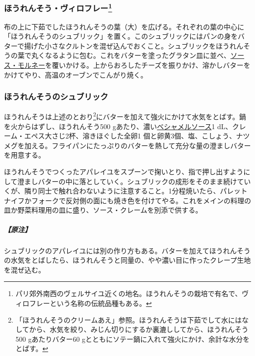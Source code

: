 \begin{recette}
\hypertarget{epinards-a-la-viroflay}{%
\subsubsection[ほうれんそう・ヴィロフレー]{\texorpdfstring{ほうれんそう・ヴィロフレー\footnote{パリ郊外南西のヴェルサイユ近くの地名。ほうれんそうの栽培で有名で、ヴィロフレーという名称の伝統品種もある。}}{ほうれんそう・ヴィロフレー}}\label{epinards-a-la-viroflay}}


布の上に下茹でしたほうれんそうの葉（大）を広げる。それぞれの葉の中心に「ほうれんそうのシュブリック」を置く。このシュブリックにはパンの身をバターで揚げた小さなクルトンを混ぜ込んでおくこと。シュブリックをほうれんそうの葉で丸くなるように包む。これをバターを塗ったグラタン皿に並べ、\protect\hyperlink{sauce-mornay}{ソース・モルネー}を覆いかける。上からおろしたチーズを振りかけ、溶かしバターをかけてやり、高温のオーブンでこんがり焼く。

\hypertarget{subric-d-epinards}{%
\subsubsection{ほうれんそうのシュブリック}\label{subric-d-epinards}}


ほうれんそうは上述のとおり\footnote{「ほうれんそうのクリームあえ」参照。ほうれんそうは下茹でして水にはなしてから、水気を絞り、みじん切りにするか裏漉ししてから、ほうれんそう500
  gあたりバター60
  gとともにソテー鍋に入れて強火にかけ、余計な水分をとばす。}にバターを加えて強火にかけて水気をとばす。鍋を火からはずし、ほうれんそう500
gあたり、濃い\protect\hyperlink{sauce-bechamel}{ベシャメルソース}1
dL、クレーム・エペス大さじ2杯、溶きほぐした全卵1
個と卵黄3個、塩、こしょう、ナツメグを加える。フライパンにたっぷりのバターを熱して充分な量の澄ましバターを用意する。

ほうれんそうでつくったアパレイユをスプーンで掬いとり、指で押し出すようにして澄ましバターの中に落としていく。シュブリックの成形をそのまま続けていくが、隣り同士で触れ合わないように注意すること。1分程焼いたら、パレットナイフかフォークで反対側の面にも焼き色を付けてやる。これをメインの料理の皿か野菜料理用の皿に盛り、ソース・クレームを別添で供する。

\hypertarget{nota-subric-d-epinards}{%
\subparagraph{【原注】}\label{nota-subric-d-epinards}}

シュブリックのアパレイユには別の作り方もある。バターを加えてほうれんそうの水気をとばしたら、ほうれんそうと同量の、やや濃い目に作ったクレープ生地を混ぜ込む。
\end{recette}
\newpage

